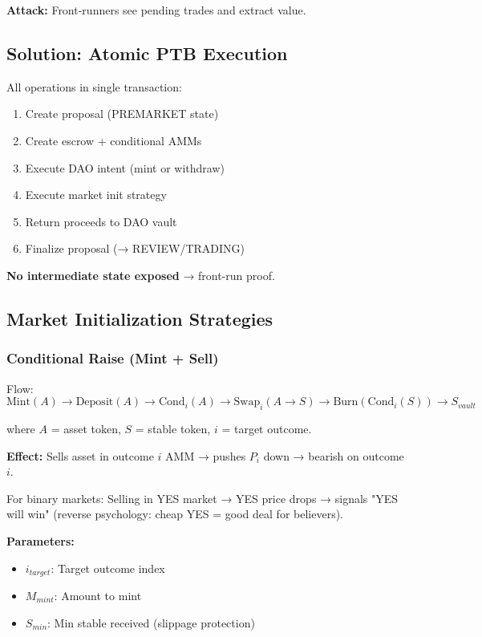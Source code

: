 \documentclass{article}
\begin{document}
\textbf{Attack:} Front-runners see pending trades and extract value.

\subsection{Solution: Atomic PTB Execution}

All operations in single transaction:
\begin{enumerate}
\item Create proposal (PREMARKET state)
\item Create escrow + conditional AMMs
\item Execute DAO intent (mint or withdraw)
\item Execute market init strategy
\item Return proceeds to DAO vault
\item Finalize proposal (→ REVIEW/TRADING)
\end{enumerate}

\textbf{No intermediate state exposed} → front-run proof.

\subsection{Market Initialization Strategies}

\subsubsection{Conditional Raise (Mint + Sell)}

Flow:
$$\text{Mint}(A) \to \text{Deposit}(A) \to \text{Cond}_i(A) \to \text{Swap}_i(A \to S) \to \text{Burn}(\text{Cond}_i(S)) \to S_{vault}$$

where $A$ = asset token, $S$ = stable token, $i$ = target outcome.

\textbf{Effect:} Sells asset in outcome $i$ AMM → pushes $P_i$ down → bearish on outcome $i$.

For binary markets: Selling in YES market → YES price drops → signals "YES will win" (reverse psychology: cheap YES = good deal for believers).

\textbf{Parameters:}
\begin{itemize}
\item $i_{target}$: Target outcome index
\item $M_{mint}$: Amount to mint
\item $S_{min}$: Min stable received (slippage protection)
\end{itemize}
\end{document}
